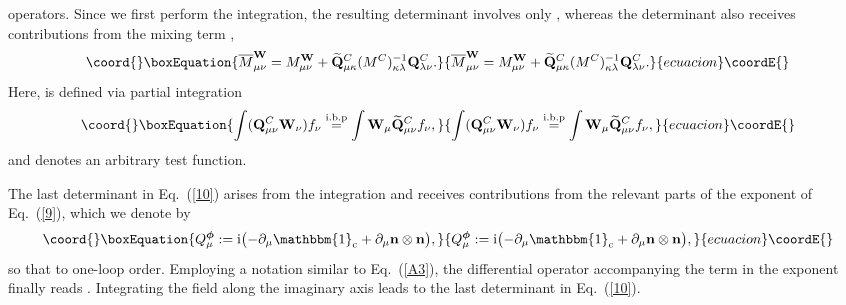 \documentclass[a4paper,12pt]{article}
\providecommand{\I}{\text{i}}
\providecommand{\re}[1]{~(\ref{#1})}\usepackage{useful_macros}
\begin{document}
operators. Since we first perform the \coordHE{} integration, the resulting
determinant involves only \coordHE{}, whereas the \myHighlight{$\mW$}\coordHE{} determinant also
receives contributions from the mixing term \coordHE{},
\begin{equation}\coord{}\boxEquation{
\overline{M}^{\mW}_{\mu\nu}={M}^{\mW}_{\mu\nu}+\widetilde{\mQ}^C_{\mu\kappa}
(M^C)^{-1}_{\kappa\lambda} \mQ^C_{\lambda\nu}. \label{A2}
}{
\overline{M}^{\mW}_{\mu\nu}={M}^{\mW}_{\mu\nu}+\widetilde{\mQ}^C_{\mu\kappa}
(M^C)^{-1}_{\kappa\lambda} \mQ^C_{\lambda\nu}. }{ecuacion}\coordE{}\end{equation}
Here, \myHighlight{$\widetilde{\mQ}$}\coordHE{} is defined via partial integration
\begin{equation}\coord{}\boxEquation{
\int (\mQ^C_{\mu\nu} \mW_\nu) f_\nu\stackrel{\text{i.b.p}}{=} \int
\mW_\mu \widetilde{\mQ}^C_{\mu\nu} f_\nu, \label{A3}
}{
\int (\mQ^C_{\mu\nu} \mW_\nu) f_\nu\stackrel{\text{i.b.p}}{=} \int
\mW_\mu \widetilde{\mQ}^C_{\mu\nu} f_\nu, }{ecuacion}\coordE{}\end{equation} 
and \coordHE{} denotes an arbitrary test function. 

The last determinant in Eq.\re{10} arises from the \myHighlight{$\mF$}\coordHE{} integration
and receives contributions from the relevant parts of the exponent of
Eq.\re{9}, which we denote by
\begin{equation}\coord{}\boxEquation{
Q^{\mF}_\mu:= \I \bigl( -\partial_\mu \mathbbm{1}_{\text{c}} +
\partial_\mu\mn \otimes \mn\bigr), \label{A4}
}{
Q^{\mF}_\mu:= \I \bigl( -\partial_\mu \mathbbm{1}_{\text{c}} +
\partial_\mu\mn \otimes \mn\bigr), }{ecuacion}\coordE{}\end{equation}
so that \coordHE{} to one-loop order.  Employing a notation similar to
Eq.\re{A3}, the differential operator accompanying the term \myHighlight{$\sim
\mF\mF$}\coordHE{} in the exponent finally reads \coordHE{}. Integrating the \myHighlight{$\mF$}\coordHE{}
field along the imaginary axis leads to the last determinant in
Eq.\re{10}.
\end{document}
